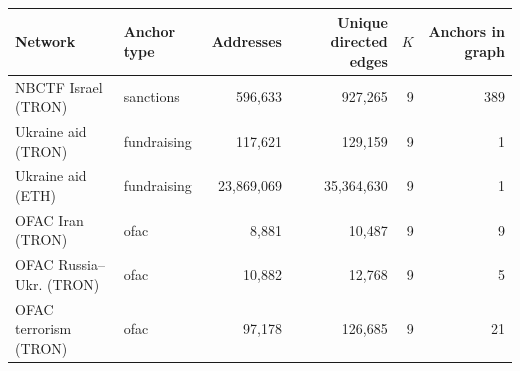 \begin{tabular}{llrrrr}
\toprule
\textbf{Network} & \textbf{Anchor type} & \textbf{Addresses} & \textbf{Unique directed edges} & $K$ & \textbf{Anchors in graph} \\
\midrule
NBCTF Israel (TRON) & sanctions & 596,633 & 927,265 & 9 & 389 \\
Ukraine aid (TRON) & fundraising & 117,621 & 129,159 & 9 & 1 \\
Ukraine aid (ETH) & fundraising & 23,869,069 & 35,364,630 & 9 & 1 \\
OFAC Iran (TRON) & ofac & 8,881 & 10,487 & 9 & 9 \\
OFAC Russia--Ukr. (TRON) & ofac & 10,882 & 12,768 & 9 & 5 \\
OFAC terrorism (TRON) & ofac & 97,178 & 126,685 & 9 & 21 \\
\bottomrule
\end{tabular}
